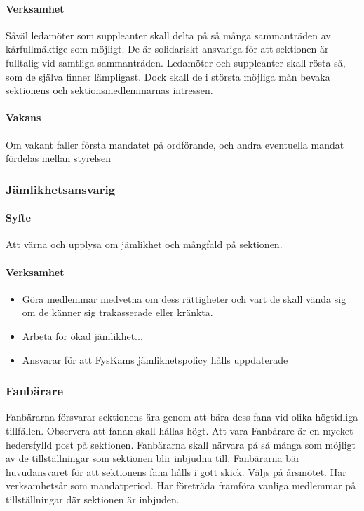 \documentclass{../resources/dgovdoc}
\begin{document}
\paragraph{Verksamhet}

Såväl ledamöter som suppleanter skall delta på så många sammanträden av kårfullmäktige som möjligt.
De är solidariskt ansvariga för att sektionen är fulltalig vid samtliga sammanträden. 
Ledamöter och suppleanter skall rösta så, som de själva finner lämpligast. Dock skall de i största möjliga mån
bevaka sektionens och sektionsmedlemmarnas intressen. 

\paragraph{Vakans}

Om vakant faller första mandatet på ordförande, och andra eventuella mandat fördelas mellan styrelsen

\subsubsection{Jämlikhetsansvarig}

\paragraph{Syfte}

Att värna och upplysa om jämlikhet och mångfald på sektionen.

\paragraph{Verksamhet}

\begin{itemize}

\item Göra medlemmar medvetna om dess rättigheter och vart de skall vända sig om de känner sig trakasserade eller kränkta.
\item Arbeta för ökad jämlikhet...
\item Ansvarar för att FysKams jämlikhetspolicy hålls uppdaterade

\end{itemize}

\subsubsection{Fanbärare}

Fanbärarna försvarar sektionens ära genom att bära dess fana vid olika högtidliga tillfällen.
Observera att fanan skall hållas högt. Att vara Fanbärare är en mycket hedersfylld post på sektionen. 
Fanbärarna skall närvara på så många som möjligt av de tillställningar som sektionen blir inbjudna till.
Fanbärarna bär huvudansvaret för att sektionens fana hålls i gott skick. 
Väljs på årsmötet. Har verksamhetsår som mandatperiod. Har företräda framföra vanliga medlemmar på
tillställningar där sektionen är inbjuden.
\end{document}
